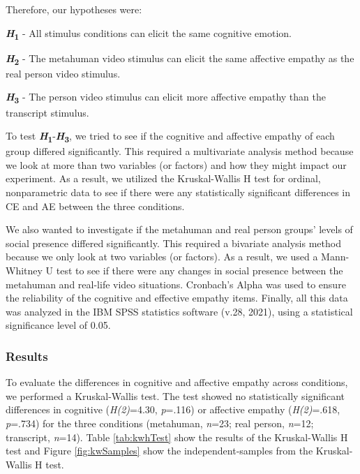 Therefore, our hypotheses were:

\textbf{\textit{H}\textsubscript{1}} - All stimulus conditions can elicit the same cognitive emotion.

\textbf{\textit{H}\textsubscript{2}} - The metahuman video stimulus can elicit the same affective empathy as the real person video stimulus.

\textbf{\textit{H}\textsubscript{3}} - The person video stimulus can elicit more affective empathy than the transcript stimulus.

To test \textbf{\textit{H}\textsubscript{1}}-\textbf{\textit{H}\textsubscript{3}}, we tried to see if the cognitive and affective empathy of each group differed significantly. This required a multivariate analysis method because we look at more than two variables (or factors) and how they might impact our experiment. As a result, we utilized the Kruskal-Wallis H test for ordinal, nonparametric data to see if there were any statistically significant differences in CE and AE between the three conditions.

We also wanted to investigate if the metahuman and real person groups' levels of social presence differed significantly. This required a bivariate analysis method because we only look at two variables (or factors). As a result, we used a Mann-Whitney U test to see if there were any changes in social presence between the metahuman and real-life video situations. Cronbach's Alpha was used to ensure the reliability of the cognitive and effective empathy items. Finally, all this data was analyzed in the IBM SPSS statistics software (v.28, 2021), using a statistical significance level of 0.05.

\subsubsection{Results}
To evaluate the differences in cognitive and affective empathy across conditions, we performed a Kruskal-Wallis test. The test showed no statistically significant differences in cognitive (\textit{H(2)}=4.30, \textit{p}=.116) or affective empathy (\textit{H(2)}=.618, \textit{p}=.734) for the three conditions (metahuman, \textit{n}=23; real person, \textit{n}=12; transcript, \textit{n}=14). Table \ref{tab:kwhTest} show the results of the Kruskal-Wallis H test and Figure \ref{fig:kwSamples} show the independent-samples from the Kruskal-Wallis H test.

